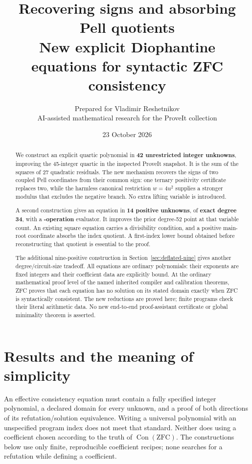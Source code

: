 \documentclass[11pt,a4paper]{article}
\title{Recovering signs and absorbing Pell quotients\\[5pt]
\large New explicit Diophantine equations for syntactic ZFC consistency}
\author{Prepared for Vladimir Reshetnikov\\
\small AI-assisted mathematical research for the ProveIt collection}
\date{23 October 2026}
\theoremstyle{remark}\newtheorem{remark}[theorem]{Remark}
\newcommand{\Con}{\operatorname{Con}}
\newcommand{\ZFC}{\mathrm{ZFC}}
\begin{document}
\maketitle
\begin{abstract}
We construct an explicit quartic polynomial in \textbf{42 unrestricted integer
unknowns}, improving the 45-integer quartic in the inspected ProveIt snapshot.
It is the sum of the squares of 27 quadratic residuals. The new mechanism
recovers the signs of two coupled Pell coordinates from their common sign:
one ternary positivity certificate replaces two, while the harmless canonical
restriction $w=4u^2$ supplies a stronger modulus that excludes the negative
branch. No extra lifting variable is introduced.

A second construction gives an equation in \textbf{14 positive unknowns},
of \textbf{exact degree 34}, with a \textbf{\PositiveOps-operation} evaluator.
It improves the prior degree-52 point at that variable count. An existing
square equation carries a divisibility condition, and a positive main-root
coordinate absorbs the index quotient. A first-index lower bound obtained
before reconstructing that quotient is essential to the proof.

The additional nine-positive construction in Section~\ref{sec:deflated-nine} gives
another degree/circuit-size tradeoff. All equations are ordinary polynomials:
their exponents are fixed integers and their coefficient data are explicitly
bound. At the ordinary mathematical proof level of the named inherited
compiler and calibration theorems, ZFC proves that each equation has no
solution on its stated domain exactly when ZFC is syntactically consistent.
The new reductions are proved here; finite programs check their literal
arithmetic data. No new end-to-end proof-assistant certificate or global
minimality theorem is asserted.
\end{abstract}
\clearpage\tableofcontents\clearpage

\section{Results and the meaning of simplicity}
\label{sec:results}

An effective consistency equation must contain a fully specified integer
polynomial, a declared domain for every unknown, and a proof of both
directions of its refutation/solution equivalence. Writing a universal
polynomial with an unspecified program index does not meet that standard.
Neither does using a coefficient chosen according to the truth of
$\Con(\ZFC)$. The constructions below use only finite, reproducible
coefficient recipes; none searches for a refutation while defining a
coefficient.
\end{document}
